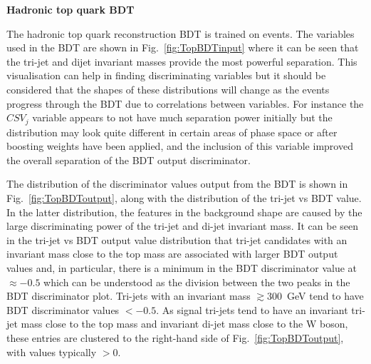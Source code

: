 \textbf{Hadronic top quark BDT}

The hadronic top quark reconstruction BDT is trained on \ttbar events. The variables used in the BDT are shown in Fig.~\ref{fig:TopBDTinput} where it can be seen that the tri-jet and dijet invariant masses provide the most powerful separation. This visualisation can help in finding discriminating variables but it should be considered that the shapes of these distributions will change as the events progress through the BDT due to correlations between variables. For instance the $CSV_{j}$ variable appears to not have much separation power initially but the distribution may look quite different in certain areas of phase space or after boosting weights have been applied, and the inclusion of this variable improved the overall separation of the BDT output discriminator.


The distribution of the discriminator values output from the BDT is shown in Fig.~\ref{fig:TopBDToutput}, along with the distribution of the tri-jet vs BDT value. In the latter distribution, the features in the background shape are caused by the large discriminating power of the tri-jet and di-jet invariant mass. It can be seen in the tri-jet vs BDT output value distribution that tri-jet candidates with an invariant mass close to the top mass are associated with larger BDT output values and, in particular, there is a minimum in the BDT discriminator value at $\approx -0.5$ which can be understood as the division between the two peaks in the BDT discriminator plot. Tri-jets with an invariant mass $\gtrsim 300$~GeV tend to have BDT discriminator values $< -0.5$. As signal tri-jets tend to have an invariant tri-jet mass close to the top mass and invariant di-jet mass close to the W boson, these entries are clustered to the right-hand side of Fig.~\ref{fig:TopBDToutput}, with values typically $>0$.

